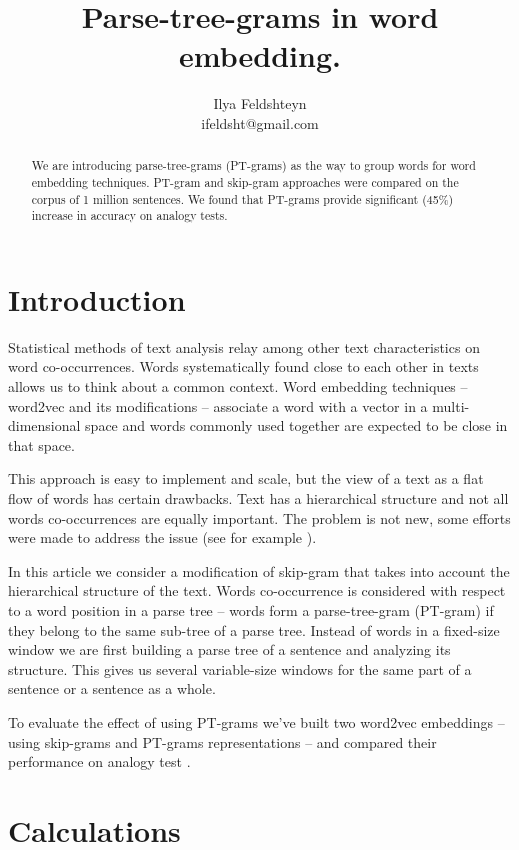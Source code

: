 \documentclass[12pt]{article}
\title{Parse-tree-grams in word embedding.}
\author{Ilya Feldshteyn\\ ifeldsht@gmail.com}
\begin{document}
\maketitle

\begin{abstract}
We are introducing parse-tree-grams (PT-grams) as the way
to group words for word embedding techniques.
PT-gram and 
skip-gram approaches were compared on the corpus of 1 million 
sentences. We found that PT-grams provide significant 
(45\%) increase in accuracy on analogy tests.
\end{abstract}


\section{Introduction}

Statistical methods of text analysis relay among other
text characteristics on word co-occurrences.
Words systematically found close to each other in texts
allows us to think about a common context. Word
embedding techniques -- word2vec and its modifications --
associate a word with a vector in a multi-dimensional
space and words commonly used together are
expected to be close in that space.

This approach is easy to implement and scale,
but the view of a text as a flat flow of words has
certain drawbacks. Text has a hierarchical structure
and not all words co-occurrences are equally important.
The problem is not new, some efforts were made to address the issue
(see for example \cite{DBLP:journals/corr/AvrahamG17}).

In this article we consider a modification of
skip-gram that takes into account the hierarchical structure of the
text. Words co-occurrence is considered with respect to a
word position in a parse tree -- words form a parse-tree-gram
(PT-gram) if they belong to the same sub-tree of a parse tree.
Instead of words in a fixed-size window we are first building
a parse tree of a sentence and analyzing its structure. This gives
us several variable-size windows for the same part of a sentence
or a sentence as a whole.

To evaluate the effect of using PT-grams we've built
two word2vec embeddings -- using skip-grams and PT-grams representations --
and compared their performance on analogy test
\cite{DBLP:journals/corr/abs-1301-3781}.

\section{Calculations}
\end{document}
